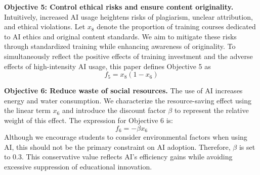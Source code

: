\documentclass{mcmthesis}
\begin{document}
\noindent\textbf{Objective 5: Control ethical risks and ensure content originality.}
Intuitively, increased AI usage heightens risks of plagiarism, unclear attribution, and ethical violations. Let $x_8$ denote the proportion of training courses dedicated to AI ethics and original content standards. We aim to mitigate these risks through standardized training while enhancing awareness of originality. To simultaneously reflect the positive effects of training investment and the adverse effects of high-intensity AI usage, this paper defines Objective 5 as
\begin{equation}
f_5=x_8(1-x_6)
\end{equation}

\noindent\textbf{Objective 6: Reduce waste of social resources.}
The use of AI increases energy and water consumption. We characterize the resource-saving effect using the linear term $x_6$ and introduce the discount factor $\beta$ to represent the relative weight of this effect. The expression for Objective 6 is:
\begin{equation}
f_6=-\beta x_6
\end{equation}
Although we encourage students to consider environmental factors when using AI, this should not be the primary constraint on AI adoption. Therefore, $\beta$ is set to 0.3. This conservative value reflects AI's efficiency gains while avoiding excessive suppression of educational innovation.
\end{document}

